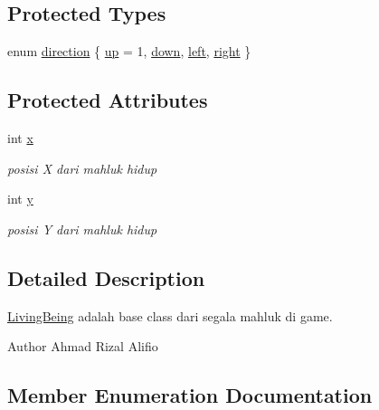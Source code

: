 \subsection*{Protected Types}
\begin{DoxyCompactItemize}
\item 
enum \mbox{\hyperlink{classLivingBeing_a26002fcf620ed05cb9ac2604038b19f1}{direction}} \{ \mbox{\hyperlink{classLivingBeing_a26002fcf620ed05cb9ac2604038b19f1a807a0a5f725e09c7c45418697f15fcbc}{up}} = 1, 
\mbox{\hyperlink{classLivingBeing_a26002fcf620ed05cb9ac2604038b19f1a2d17cadb69dbb99d60cc20545f44858b}{down}}, 
\mbox{\hyperlink{classLivingBeing_a26002fcf620ed05cb9ac2604038b19f1ac72132c2bcae3ec9867a256367ed67e5}{left}}, 
\mbox{\hyperlink{classLivingBeing_a26002fcf620ed05cb9ac2604038b19f1aa842c9316ffaf4e452e6a19c9552ba07}{right}}
 \}
\end{DoxyCompactItemize}
\subsection*{Protected Attributes}
\begin{DoxyCompactItemize}
\item 
int \mbox{\hyperlink{classLivingBeing_a5007230d07e60ebd845dfd87ddc4a5e0}{x}}
\begin{DoxyCompactList}\small\item\em posisi X dari mahluk hidup \end{DoxyCompactList}\item 
int \mbox{\hyperlink{classLivingBeing_a3c8a9e6124ef52ea0554bc14e20b7486}{y}}
\begin{DoxyCompactList}\small\item\em posisi Y dari mahluk hidup \end{DoxyCompactList}\end{DoxyCompactItemize}


\subsection{Detailed Description}
\mbox{\hyperlink{classLivingBeing}{Living\+Being}} adalah base class dari segala mahluk di game. 

\begin{DoxyAuthor}{Author}
Ahmad Rizal Alifio 
\end{DoxyAuthor}


\subsection{Member Enumeration Documentation}
\mbox{\label{classLivingBeing_a26002fcf620ed05cb9ac2604038b19f1}} 
